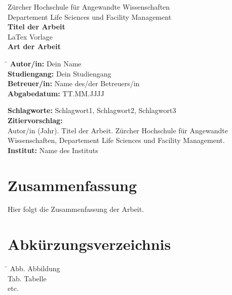 \documentclass[a4paper,12pt,twoside]{article}
\begin{document}
	
	\begin{titlepage}
		\centering
		{\Large Zürcher Hochschule für Angewandte Wissenschaften\\
			Departement Life Sciences und Facility Management\\[2cm]}
		{\Large \textbf{Titel der Arbeit}\\[1cm]}
		{\large LaTex Vorlage\\[1cm]}
		{\large \textbf{Art der Arbeit}\\[1cm]}
		\begin{tabbing}
			\hspace*{6cm} \= \kill
			\textbf{Autor/in:}    \> Dein Name\\
			\textbf{Studiengang:} \> Dein Studiengang\\
			\textbf{Betreuer/in:} \> Name des/der Betreuers/in\\
			\textbf{Abgabedatum:} \> TT.MM.JJJJ
		\end{tabbing}
		\vfill
	\end{titlepage}
	
	\newpage
	\thispagestyle{empty}
	\noindent
	
	\textbf{Schlagworte:} Schlagwort1, Schlagwort2, Schlagwort3\\[1cm]
	\textbf{Zitiervorschlag:}\\
	Autor/in (Jahr). Titel der Arbeit. Zürcher Hochschule für Angewandte Wissenschaften, Departement Life Sciences und Facility Management.\\[1cm]
	\textbf{Institut:} Name des Instituts
	
	\newpage
	\section*{Zusammenfassung}
	Hier folgt die Zusammenfassung der Arbeit.
	
	\newpage
	\section*{Abkürzungsverzeichnis}
	\begin{tabbing}
		\hspace*{3cm} \= \kill
		Abb. \> Abbildung\\
		Tab. \> Tabelle\\
		etc.
	\end{tabbing}
	
	
	\newpage
	\tableofcontents
	\addtocontents{toc}{\protect\setcounter{tocdepth}{3}}
	\thispagestyle{empty}
	
\end{document}
